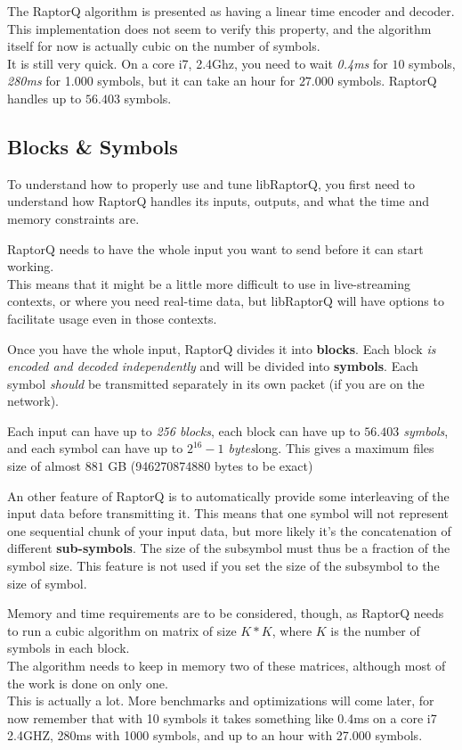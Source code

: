 \documentclass[11pt,a4paper]{refart}
\begin{document}
 The RaptorQ algorithm is presented as having a linear time encoder and decoder. This implementation does not seem to verify
this property, and the algorithm itself for now is actually cubic on the number of symbols.\\
It is still very quick. On a core i7, 2.4Ghz, you need to wait \textit{0.4ms} for $10$ symbols, \textit{280ms} for 1.000 symbols, but it can take an hour for $27.000$ symbols.
RaptorQ handles up to $56.403$ symbols.

\subsection{Blocks \& Symbols}

To understand how to properly use and tune libRaptorQ, you first need to understand how RaptorQ handles its inputs, outputs, and what the time and memory
constraints are.

RaptorQ needs to have the whole input you want to send before it can start working.\\
This means that it might be a little more difficult to use in live-streaming contexts, or where you need real-time data, but libRaptorQ will have options to
facilitate usage even in those contexts.

Once you have the whole input, RaptorQ divides it into \textbf{blocks}. Each block \textit{is encoded and decoded independently} and will be divided into \textbf{symbols}. Each symbol \textit{should}
be transmitted separately in its own packet (if you are on the network).

Each input can have up to \textit{256 blocks}, each block can have up to \textit{$56.403$ symbols}, and each
symbol can have up to \textit{$2^{16}-1$ bytes}long. This gives a maximum files size of almost $881$ GB (946270874880 bytes to be exact)

An other feature of RaptorQ is to automatically provide some interleaving of the input data before transmitting it. This means that one symbol will not
represent one sequential chunk of your input data, but more likely it's the concatenation of different \textbf{sub-symbols}. The size of the subsymbol must thus
be a fraction of the symbol size. This feature is not used if you set the size of the subsymbol to the size of symbol.


Memory and time requirements are to be considered, though, as RaptorQ needs to run a cubic algorithm on matrix of size $K*K$, where $K$ is the number of
symbols in each block.\\
The algorithm needs to keep in memory two of these matrices, although most of the work is done on only one.\\
This is actually a lot. More benchmarks and optimizations will come later, for now remember that with 10 symbols it takes something like 0.4ms on a core i7 2.4GHZ, 280ms with 1000 symbols, and up to an hour with 27.000 symbols.
\end{document}
